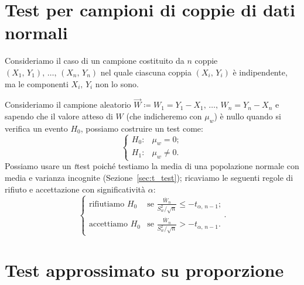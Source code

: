     \section{Test per campioni di coppie di dati normali}
        \begin{defn}
            Consideriamo il caso di un campione costituito da $n$ coppie \\
            $(X_1,\,Y_1),\, \ldots,\, (X_n,\,Y_n)$ nel quale ciascuna coppia $(X_i,\,Y_i)$ è indipendente, 
            ma le componenti $X_i,\,Y_i$ non lo sono.

            Consideriamo il campione aleatorio $\vec{W} \coloneqq W_1 = Y_1-X_1,\, \ldots,\, W_n=Y_n-X_n$ e 
            sapendo che il valore atteso di $W$ (che indicheremo con $\mu_w$) è nullo quando si verifica 
            un evento $H_0$, possiamo costruire un test come: \[
                \begin{cases}
                    H_0 : & \mu_w = 0; \\
                    H_1 : & \mu_w \neq 0.
                \end{cases}
            \] Possiamo usare un \emph{t}\nbdash test poiché testiamo la media di una popolazione normale con 
            media e varianza incognite (Sezione~\ref{sec:t_test}); ricaviamo le seguenti regole di rifiuto e 
            accettazione con significatività $\alpha$: \[
                \begin{cases}
                    \text{rifiutiamo } H_0 & 
                    \text{se $\frac{\overline{W}_n}{S_w^2 /\sqrt{n}} \leq -t_{\alpha,\, n-1}$;} \\
                    \text{accettiamo } H_0 & 
                    \text{se $\frac{\overline{W}_n}{S_w^2 /\sqrt{n}} > -t_{\alpha,\, n-1}$.}
                \end{cases}
            .\] 
        \end{defn}
    \section{Test approssimato su proporzione}
